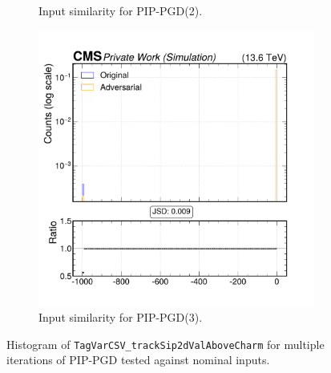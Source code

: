 \begin{figure}[htbp]
\begin{subfigure}[t]{0.32\textwidth}
    \caption*{Input similarity for PIP-PGD(2).}
  \end{subfigure}\hfill
  \begin{subfigure}[t]{0.32\textwidth}
    \includegraphics[width=\linewidth]{media/output/features/compare/combined_it_3/cmp_global_features_TagVarCSV_trackSip2dValAboveCharm.pdf}
    \caption*{Input similarity for PIP-PGD(3).}
  \end{subfigure}

  \caption*{Histogram of \texttt{TagVarCSV\_trackSip2dValAboveCharm} for multiple iterations of PIP-PGD tested against nominal inputs.}
  \label{fig:combined_input_TagVarCSV_trackSip2dValAboveCharm}
\end{figure}

